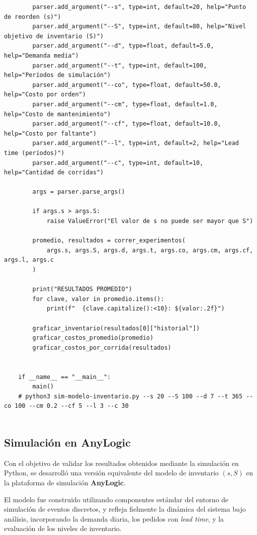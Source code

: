 \documentclass[12pt]{article}
\begin{document}
\begin{verbatim}
        parser.add_argument("--s", type=int, default=20, help="Punto de reorden (s)")
        parser.add_argument("--S", type=int, default=80, help="Nivel objetivo de inventario (S)")
        parser.add_argument("--d", type=float, default=5.0, help="Demanda media")
        parser.add_argument("--t", type=int, default=100, help="Períodos de simulación")
        parser.add_argument("--co", type=float, default=50.0, help="Costo por orden")
        parser.add_argument("--cm", type=float, default=1.0, help="Costo de mantenimiento")
        parser.add_argument("--cf", type=float, default=10.0, help="Costo por faltante")
        parser.add_argument("--l", type=int, default=2, help="Lead time (períodos)")
        parser.add_argument("--c", type=int, default=10, help="Cantidad de corridas")
    
        args = parser.parse_args()
    
        if args.s > args.S:
            raise ValueError("El valor de s no puede ser mayor que S")
    
        promedio, resultados = correr_experimentos(
            args.s, args.S, args.d, args.t, args.co, args.cm, args.cf, args.l, args.c
        )
    
        print("RESULTADOS PROMEDIO")
        for clave, valor in promedio.items():
            print(f"  {clave.capitalize():<10}: ${valor:.2f}")
    
        graficar_inventario(resultados[0]["historial"])
        graficar_costos_promedio(promedio)
        graficar_costos_por_corrida(resultados)
    
    
    if __name__ == "__main__":
        main()
    # python3 sim-modelo-inventario.py --s 20 --S 100 --d 7 --t 365 --co 100 --cm 0.2 --cf 5 --l 3 --c 30
       
\end{verbatim}


\subsection{Simulación en AnyLogic}

Con el objetivo de validar los resultados obtenidos mediante la simulación en Python, se desarrolló una versión equivalente del modelo de inventario $(s, S)$ en la plataforma de simulación \textbf{AnyLogic}.

El modelo fue construido utilizando componentes estándar del entorno de simulación de eventos discretos, y refleja fielmente la dinámica del sistema bajo análisis, incorporando la demanda diaria, los pedidos con \textit{lead time}, y la evaluación de los niveles de inventario.
\end{document}
